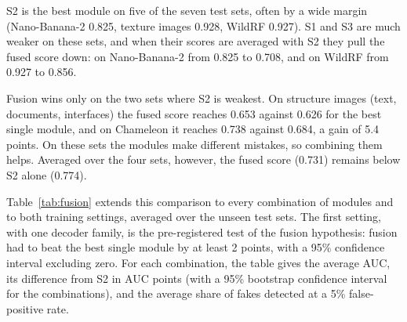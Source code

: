 S2 is the best module on five of the seven test sets, often by a wide margin (Nano-Banana-2 0.825, texture images 0.928, WildRF 0.927). S1 and S3 are much weaker on these sets, and when their scores are averaged with S2 they pull the fused score down: on Nano-Banana-2 from 0.825 to 0.708, and on WildRF from 0.927 to 0.856.

Fusion wins only on the two sets where S2 is weakest. On structure images (text, documents, interfaces) the fused score reaches 0.653 against 0.626 for the best single module, and on Chameleon it reaches 0.738 against 0.684, a gain of 5.4 points. On these sets the modules make different mistakes, so combining them helps. Averaged over the four sets, however, the fused score (0.731) remains below S2 alone (0.774).

Table~\ref{tab:fusion} extends this comparison to every combination of modules and to both training settings, averaged over the unseen test sets. The first setting, with one decoder family, is the pre-registered test of the fusion hypothesis: fusion had to beat the best single module by at least 2 points, with a 95\% confidence interval excluding zero. For each combination, the table gives the average AUC, its difference from S2 in AUC points (with a 95\% bootstrap confidence interval for the combinations), and the average share of fakes detected at a 5\% false-positive rate.

